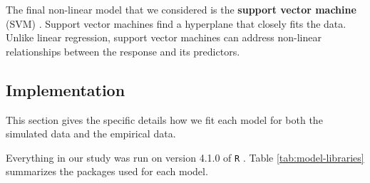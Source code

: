 \documentclass{article}
\begin{document}

	The final non-linear model that we considered is the \textbf{support vector machine} (SVM) \cite{cortes1995support, drucker1997support}. Support vector machines find a hyperplane that closely fits the data. Unlike linear regression, support vector machines can address non-linear relationships between the response and its predictors.
	
	
	\subsection{Implementation}
	
	This section gives the specific details how we fit each model for both the simulated data and the empirical data.

	 Everything in our study was run on version 4.1.0 of \lstinline!R! \cite{r}. Table \ref{tab:model-libraries} summarizes the packages used for each model.
	 
\end{document}
